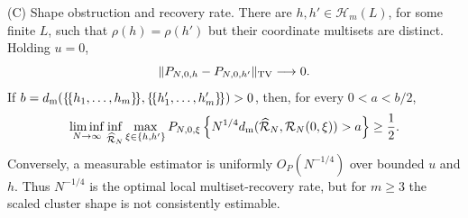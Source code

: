 \begin{theorem}
\smallskip\noindent\textup{(C) Shape obstruction and recovery rate.}
There are \(h,h'\in\mathcal H_m(L)\), for some finite \(L\), such that
\(\rho(h)=\rho(h')\) but their coordinate multisets are distinct.  Holding
\(u=0\),
\begin{equation}
 \|P_{N,0,h}-P_{N,0,h'}\|_{\rm TV}\longrightarrow0.
\label{eq:main-shape-tv-collapse}
\end{equation}
If
\(b=d_{\rm m}(\{\!\{h_1,\ldots,h_m\}\!\},
\{\!\{h'_1,\ldots,h'_m\}\!\})>0\), then, for every \(0<a<b/2\),
\begin{equation}
 \liminf_{N\to\infty}\inf_{\widehat{\mathcal R}_N}
 \max_{\xi\in\{h,h'\}}P_{N,0,\xi}\left\{
 N^{1/4}d_{\rm m}(\widehat{\mathcal R}_N,
 \mathcal R_N(0,\xi))>a\right\}\ge\frac12.
\label{eq:main-shape-minimax-lower}
\end{equation}
Conversely, a measurable estimator is uniformly
\(O_P(N^{-1/4})\) over bounded \(u\) and \(h\).  Thus \(N^{-1/4}\) is the
optimal local multiset-recovery rate, but for \(m\ge3\) the scaled cluster
shape is not consistently estimable.
\end{theorem}

